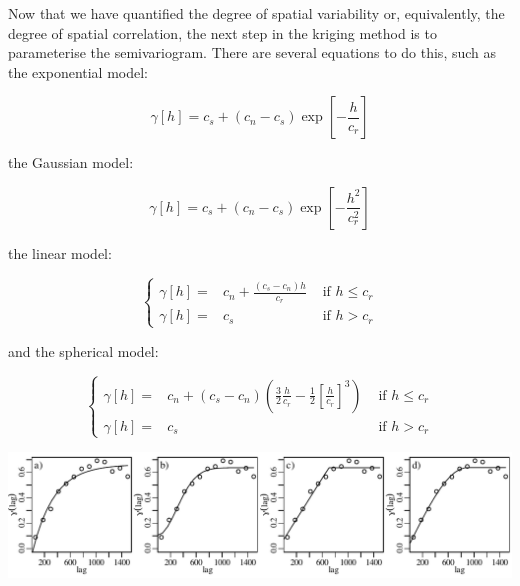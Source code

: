 Now that we have quantified the degree of spatial variability or,
equivalently, the degree of spatial correlation, the next step in the
kriging method is to parameterise the semivariogram. There are several
equations to do this, such as the exponential model:

\begin{equation}
  \gamma[h] = c_s + (c_n-c_s) \exp\left[-\frac{h}{c_r}\right]
  \label{eq:semivariogramexponential}
\end{equation}

\noindent the Gaussian model:

\begin{equation}
  \gamma[h] = c_s + (c_n-c_s) \exp\left[-\frac{h^2}{c_r^2}\right]
  \label{eq:semivariogramgaussian}
\end{equation}

\noindent the linear model:

\begin{equation}
  \left\{
  \begin{aligned}
  \gamma[h] = & c_n + \frac{(c_s-c_n) h}{c_r} & \mbox{~if~}{h}\leq{c_r}\\
    \gamma[h] = & c_s & \mbox{~if~} h>c_r 
  \end{aligned}
  \right.
    \label{eq:semivariogramlinear}
\end{equation}

\noindent and the spherical model:

\begin{equation}
  \left\{
  \begin{aligned}
    \gamma[h] = & c_n + (c_s-c_n)
    \left(\frac{3}{2}\frac{h}{c_r} -
    \frac{1}{2}\left[\frac{h}{c_r}\right]^3\right)
    & \mbox{~if~}{h}\leq{c_r}\\
    \gamma[h] = & c_s & \mbox{~if~} h>c_r
  \end{aligned}
  \right.
  \label{eq:semivariogramspherical}
\end{equation}

\noindent
\includegraphics[width=\textwidth]{../figures/semivariogramfit.pdf}
\begingroup {}
\label{fig:semivariogramfit}
\endgroup


